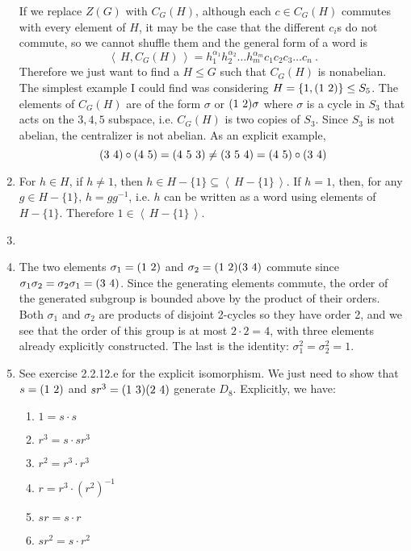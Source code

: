 \documentclass[]{article}
\newcommand{\gen}[1]{\left\langle\, #1 \,\right\rangle}
\newcommand*{\cycle}[1]{( \foreach \entry [count=\i] in {#1} {\ifnum\i>1\ \fi\entry})}
\begin{document}
\begin{enumerate}
If we replace $Z(G)$ with $C_G(H)$, although each $c\in C_G(H)$ commutes with every element of $H$, it may be the case that the different $c_i$s do not commute, so we cannot shuffle them and the general form of a word is
\begin{equation}
\gen{H,C_G(H)} = h_1^{\alpha_1}h_2^{\alpha_2}\ldots h_m^{\alpha_m}c_1c_2c_3\ldots c_n\ .
\end{equation}
Therefore we just want to find a $H \leq G$ such that $C_G(H)$ is nonabelian. The simplest example I could find was considering $H = \{1, \cycle{1,2}\} \leq S_5$. The elements of $C_G(H)$ are of the form $\sigma$ or $\cycle{1,2}\sigma$ where $\sigma$ is a cycle in $S_3$ that acts on the $3,4,5$ subspace, i.e. $C_G(H)$ is two copies of $S_3$. Since $S_3$ is not abelian, the centralizer is not abelian. As an explicit example,
\begin{equation}
\cycle{3,4} \circ \cycle{4,5} = \cycle{4,5,3} \neq \cycle{3,5,4} = \cycle{4,5} \circ \cycle{3,4}
\end{equation}


\item For $h\in H$, if $h \neq 1$, then $h \in H - \{1\} \subseteq \gen{H - \{1\}}$. If $h = 1$, then, for any $g \in H - \{1\}$, $h = gg^{-1}$, i.e. $h$ can be written as a word using elements of $H - \{1\}$. Therefore $1 \in \gen{H - \{1\}}$.


\item 


\item The two elements $\sigma_1 = \cycle{1,2}$ and $\sigma_2 = \cycle{1,2}\cycle{3,4}$ commute since $\sigma_1\sigma_2 = \sigma_2\sigma_1 = \cycle{3,4}$. Since the generating elements commute, the order of the generated subgroup is bounded above by the product of their orders. Both $\sigma_1$ and $\sigma_2$ are products of disjoint 2-cycles so they have order 2, and we see that the order of this group is at most $2\cdot 2 = 4$, with three elements already explicitly constructed. The last is the identity: $\sigma_1^2 = \sigma_2^2 = 1$.


\item See exercise 2.2.12.e for the explicit isomorphism. We just need to show that $s = \cycle{1,2}$ and $sr^3 = \cycle{1,3}\cycle{2,4}$ generate $D_8$. Explicitly, we have:
\begin{enumerate}
\item $1 = s\cdot s$
\item $r^3 = s\cdot sr^3$
\item $r^2 = r^3 \cdot r^3$
\item $r = r^3 \cdot (r^2)^{-1}$
\item $sr = s\cdot r$
\item $sr^2 = s\cdot r^2$
\end{enumerate}



\end{enumerate}
\end{document}

